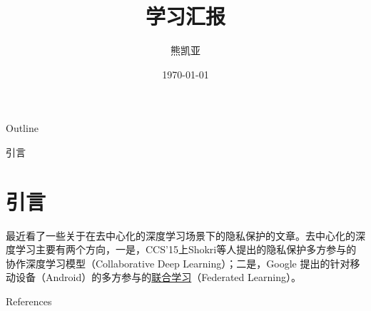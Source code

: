 \documentclass[aspectration=169]{beamer}
\title{学习汇报}
\author{熊凯亚}
\date{\today}
\institute[JNU]{Jinan University}
\begin{document}
\begin{frame}
\titlepage
\end{frame}

\begin{frame}{Outline}
\tableofcontents[part=1, pausesections]
\end{frame}

\begin{frame}{引言}

\section{引言}


最近看了一些关于在去中心化的深度学习场景下的隐私保护的文章。去中心化的深度学习主要有两个方向，一是，CCS'15上Shokri等人\cite{shokri2015privacy}提出的隐私保护多方参与的协作深度学习模型（Collaborative Deep Learning）；二是，Google 提出的针对移动设备（Android）的多方参与的\href{https://research.googleblog.com/2017/04/federated-learning-collaborative.html}{联合学习}（Federated Learning）。\\



\end{frame}


\begin{frame}{References}


\end{frame}
\end{document}
